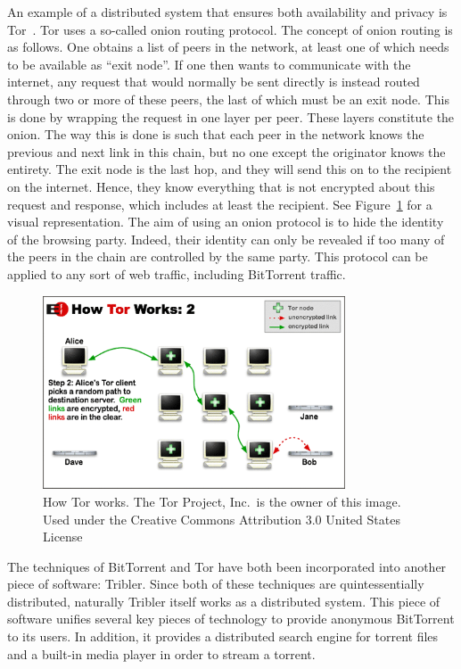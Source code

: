 \documentclass[a4paper,11pt]{book}
\theoremstyle{definition}
\begin{document}
An example of a distributed system that ensures both availability and privacy is
Tor~\cite{dingledine2004tor}. Tor uses a so-called onion routing protocol. 
The concept of onion routing is as follows. One obtains a list of peers in the
network, at least one of which needs to be available as ``exit node''. If one
then wants to communicate with the internet, any request that would normally
be sent directly is instead routed through two or more of these peers, the last
of which must be an exit node. This is done by wrapping the request in one
layer per peer. These layers constitute the onion. The way this is done is such
that each peer in the network knows the previous and next link in this chain,
but no one except the originator knows the entirety. The exit node is the last
hop, and they will send this on to the recipient on the internet. Hence, they
know everything that is not encrypted about this request and response, which includes at
least the recipient. See Figure~\ref{fig:htw2} for a visual representation.
The aim of using an onion protocol is to hide the identity of the browsing party. Indeed,
their identity can only be revealed if too many of the peers in the chain are controlled
by the same party. This protocol can be applied to any sort of web traffic, including
BitTorrent traffic. 

\begin{figure}[ht]
    \centering
    \includegraphics[width=0.8\textwidth]{plots_all/htw2}
    \caption{How Tor works. The Tor Project, Inc.\protect\footnotemark~is the owner of this image. 
    Used under the Creative Commons Attribution 3.0 United States License\protect\footnotemark }
    \label{fig:htw2}

\end{figure}

The techniques of BitTorrent and Tor have both been incorporated into another piece
of software: Tribler. Since both of these techniques are quintessentially distributed,
naturally Tribler itself works as a distributed system. This piece of software unifies
several key pieces of technology to provide anonymous BitTorrent to its users. In addition,
it provides a distributed search engine for torrent files and a built-in media player in
order to stream a torrent. 
\end{document}
